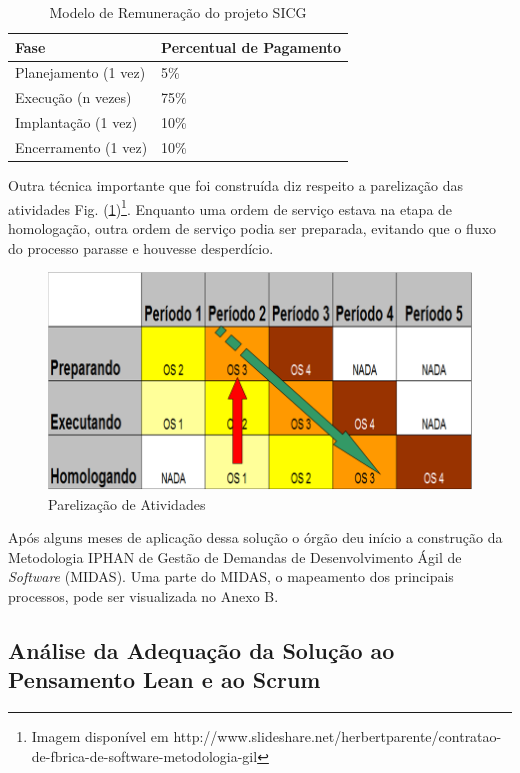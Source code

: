 \begin{table}[H]
\center
\footnotesize
\begin{tabular}{|p{6cm}|p{6cm}|}
  \hline
   \textbf{Fase} & \textbf{Percentual de Pagamento}\\
    \hline
   Planejamento (1 vez) & 5\%\\
   \hline    
   Execução (n vezes) & 75\%\\
    \hline
   Implantação (1 vez) & 10\%\\
   \hline
   Encerramento (1 vez) & 10\%\\
   \hline
\end{tabular}
\caption{Modelo de Remuneração do projeto SICG}
\label{remuneracao}
\end{table}


Outra técnica importante que foi construída diz respeito a parelização das atividades Fig. (\ref{kanban5})\footnote{Imagem disponível em http://www.slideshare.net/herbertparente/contratao-de-fbrica-de-software-metodologia-gil}. Enquanto uma ordem de serviço estava na etapa de homologação, outra ordem de serviço podia ser preparada, evitando que o fluxo do processo parasse e houvesse desperdício. 

\begin{figure}[H]
		\centering
		
			\includegraphics[scale=0.5]{figuras/kanbanIPHAN5.png}
		\caption{Parelização de Atividades}
		\label{kanban5}
\end{figure}

Após alguns meses de aplicação dessa solução o órgão deu início a construção da Metodologia IPHAN de Gestão de Demandas de Desenvolvimento Ágil de \textit{Software} (MIDAS). Uma parte do MIDAS, o mapeamento dos principais processos, pode ser visualizada no Anexo B.

\subsection[Análise da Adequação da Solução ao Pensamento Lean e ao Scrum]{Análise da Adequação da Solução ao Pensamento Lean e ao Scrum}

